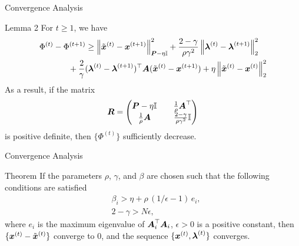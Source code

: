 \documentclass[9pt]{beamer}
\begin{document}
\begin{frame}{Convergence Analysis}
\begin{block}{Lemma 2}
For $t \ge 1$, we have
\begin{equation}
\label{eq:fcn_decrease}
\begin{multlined}
\Phi^{(t)} - \Phi^{(t+1)}  
\ge \norm{\xtil^{(t)}-\bbsym{x}^{(t+1)}}_{\bbsym{P}-\eta \II}^2
+ \frac{2-\gamma}{\rho \gamma^2} \norm{\bbsym{\lambda}^{(t)}-\bbsym{\lambda}^{(t+1)}}_2^2 \\
+ \frac{2}{\gamma} (\bbsym{\lambda}^{(t)}-\bbsym{\lambda}^{(t+1)})^\top \bbsym{A} (\xtil^{(t)}-\bbsym{x}^{(t+1)})
+ \eta \norm{\xtil^{(t)}-\bbsym{x}^{(t)}}_2^2
\end{multlined}
\end{equation}
As a result, if the matrix 
\begin{equation}
\boldsymbol{R} = 
\begin{pmatrix}
\boldsymbol{P} - \eta \mathbb{I} & \quad \frac{1}{\rho} \boldsymbol{A}^\top \\
\frac{1}{\rho} \boldsymbol{A} & \quad \frac{2-\gamma}{\rho \gamma^2} \mathbb{I} \\
\end{pmatrix}
\end{equation}
is positive definite, then $\{\Phi^{(t)}\}$ sufficiently decrease.
\end{block}
\end{frame}

\begin{frame}{Convergence Analysis}
\begin{block}{Theorem}
If the parameters $\rho$, $\gamma$, and $\beta$ are chosen such that the following conditions are satisfied
\begin{equation}
\label{eq:conditions}
\begin{split}
& \beta_i > \eta + \rho\, (1/\epsilon-1)\, e_i, \\
& 2-\gamma > N \epsilon,
\end{split}
\end{equation}
where $e_i$ is the maximum eigenvalue of $\boldsymbol{A}_i^\top \boldsymbol{A}_i$, $\epsilon > 0$ is a positive constant,
then $\{\boldsymbol{x}^{(t)} - \tilde{\boldsymbol{x}}^{(t)}\}$ converge to 0, and the sequence $\{\boldsymbol{x}^{(t)} , \boldsymbol{\lambda}^{(t)}\}$ converges.
\end{block}
\end{frame}
\end{document}
